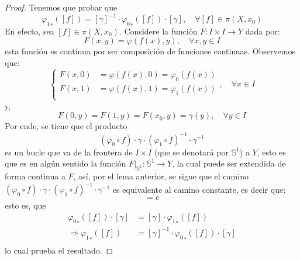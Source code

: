 \documentclass{article}
\newcounter{it}
\theoremstyle{largebreak}
\newcommand\cf[3]{\ensuremath{#1:#2\rightarrow#3}}
\begin{document}
    \begin{proof}
        Tenemos que probar que
        \begin{equation*}
            {\varphi_1}_*\left([f]\right)=[\gamma]^{-1}\cdot{\varphi_0}_*\left([f]\right)\cdot[\gamma],\quad\forall [f]\in\pi(X,x_0)
        \end{equation*}
        En efecto, sea $[f]\in\pi(X,x_0)$. Considere la función $\cf{F}{I\times I}{Y}$ dada por:
        \begin{equation*}
            F(x,y)=\varphi(f(x),y),\quad\forall x,y\in I
        \end{equation*}
        esta función es continua por ser composición de funciones continuas. Observemos que:
        \begin{equation*}
            \left\{ 
                \begin{split}
                    F(x,0) & = \varphi(f(x),0)=\varphi_0(f(x)) \\
                    F(x,1) & = \varphi(f(x),1)=\varphi_1(f(x)) \\
                \end{split}
            \right.,\quad\forall x\in I
        \end{equation*}
        y,
        \begin{equation*}
            F(0,y)=F(1,y)=F(x_0,y)=\gamma(y),\quad\forall y\in I
        \end{equation*}
        Por ende, se tiene que el producto
        \begin{equation*}
            \left(\varphi_0\circ f \right)\cdot\gamma\cdot\left(\varphi_1\circ f \right)^{-1}\cdot\gamma^{-1}
        \end{equation*}
        es un bucle que va de la frontera de $I\times I$ (que se denotará por $\mathbb{S}^1$) a $Y$, esto es que es en algún sentido la función $\cf{F\big|_{\mathbb{S}^1}}{\mathbb{S}^1}{Y}$, la cual puede ser extendida de forma continua a $F$, así, por el lema anterior, se sigue que el camino $\left(\varphi_0\circ f \right)\cdot\gamma\cdot\left(\varphi_1\circ f \right)^{-1}\cdot\gamma^{-1}$ es equivalente al camino constante, es decir que:
        \begin{equation*}
            [\left(\varphi_0\circ f \right)\cdot\gamma\cdot\left(\varphi_1\circ f \right)^{-1}\cdot\gamma^{-1}]=e
        \end{equation*}
        esto es, que
        \begin{equation*}
            \begin{split}
                {\varphi_0}_*\left([f]\right)\cdot[\gamma]&=[\gamma]\cdot{\varphi_1}_*\left([f]\right)\\
                \Rightarrow {\varphi_1}_*\left([f]\right)&=[\gamma]^{-1}\cdot{\varphi_0}_*\left([f]\right)\cdot[\gamma]\\
            \end{split}
        \end{equation*}
        lo cual prueba el resultado.
    \end{proof}
\end{document}
